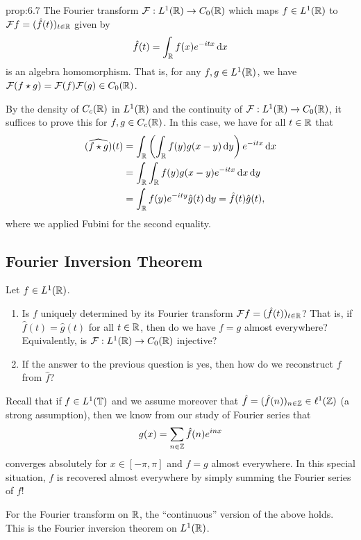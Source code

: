 \begin{prop}{prop:6.7}
    The Fourier transform ${\cal F} : L^1(\mathbb{R}) \to C_0(\mathbb{R})$ which 
    maps $f \in L^1(\mathbb{R})$ to ${\cal F}f = (\hat f(t))_{t\in\mathbb{R}}$ given by 
    \[ \hat f(t) = \int_{\mathbb{R}} f(x) e^{-itx}\,\mathrm{d} x \] 
    is an algebra homomorphism. That is, for any $f, g \in L^1(\mathbb{R})$, 
    we have ${\cal F}(f \star g) = {\cal F}(f) {\cal F}(g) \in C_0(\mathbb{R})$. 
\end{prop}
\begin{pf}
    By the density of $C_c(\mathbb{R})$ in $L^1(\mathbb{R})$ and the continuity of ${\cal F} : 
    L^1(\mathbb{R}) \to C_0(\mathbb{R})$, it suffices to prove this for $f, g \in C_c(\mathbb{R})$. 
    In this case, we have for all $t \in \mathbb{R}$ that 
    \begin{align*}
        (\widehat{f \star g})(t) 
        &= \int_{\mathbb{R}} \left( \int_{\mathbb{R}} f(y)g(x-y)\,\mathrm{d} y \right) e^{-itx}\,\mathrm{d} x \\ 
        &= \int_{\mathbb{R}} \int_{\mathbb{R}} f(y) g(x-y) e^{-itx}\,\mathrm{d} x \,\mathrm{d} y \\ 
        &= \int_{\mathbb{R}} f(y) e^{-ity} \hat g(t) \,\mathrm{d} y = \hat f(t) \hat g(t),
    \end{align*}
    where we applied Fubini for the second equality. 
\end{pf}

\subsection{Fourier Inversion Theorem} \label{subsec:6.3}
Let $f \in L^1(\mathbb{R})$. 
\begin{enumerate}[(1)]
    \item Is $f$ uniquely determined by its Fourier transform 
    ${\cal F}f = (\hat f(t))_{t\in\mathbb{R}}$? That is, if $\hat f(t) = \hat g(t)$
    for all $t \in \mathbb{R}$, then do we have $f = g$ almost everywhere? 
    Equivalently, is ${\cal F} : L^1(\mathbb{R}) \to C_0(\mathbb{R})$ injective? 
    \item If the answer to the previous question is yes, then how do we reconstruct 
    $f$ from $\hat f$? 
\end{enumerate}
Recall that if $f \in L^1(\mathbb{T})$ and we assume moreover that $\hat f = 
(\hat f(n))_{n\in\mathbb{Z}} \in \ell^1(\mathbb{Z})$ (a strong assumption), then we know 
from our study of Fourier series that 
\[ g(x) = \sum_{n\in\mathbb{Z}} \hat f(n) e^{inx} \] 
converges absolutely for $x \in [-\pi, \pi]$ and $f = g$ almost everywhere. 
In this special situation, $f$ is recovered almost everywhere by simply 
summing the Fourier series of $f$!

For the Fourier transform on $\mathbb{R}$, the ``continuous'' version of the above holds. 
This is the Fourier inversion theorem on $L^1(\mathbb{R})$. 

